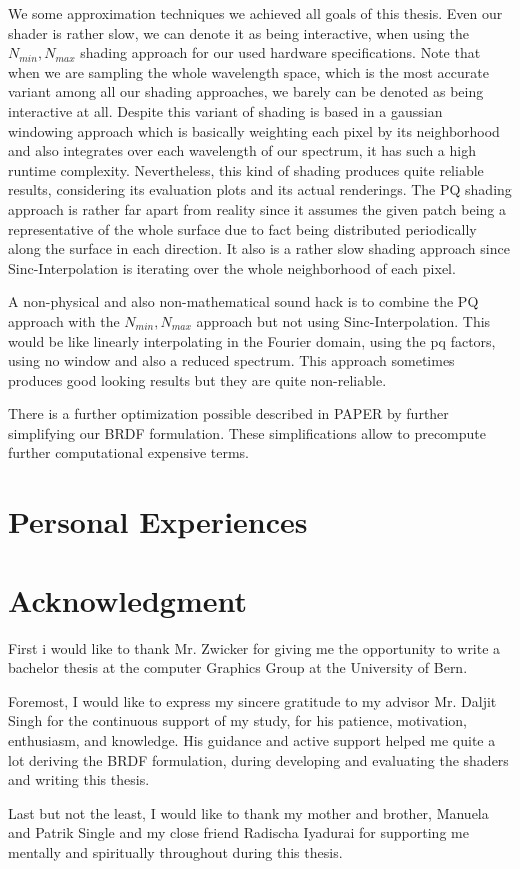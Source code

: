 We some approximation techniques we achieved all goals of this thesis. Even our shader is rather slow, we can denote it as being interactive, when using the $N_{min}, N_{max}$ shading approach for our used hardware specifications. Note that when we are sampling the whole wavelength space, which is the most accurate variant among all our shading approaches, we barely can be denoted as being interactive at all. Despite this variant of shading is based in a gaussian windowing approach which is basically weighting each pixel by its neighborhood and also integrates over each wavelength of our spectrum, it has such a high runtime complexity. Nevertheless, this kind of shading produces quite reliable results, considering its evaluation plots and its actual renderings. The PQ shading approach is rather far apart from reality since it assumes the given patch being a representative of the whole surface due to fact being distributed periodically along the surface in each direction. It also is a rather slow shading approach since Sinc-Interpolation is iterating over the whole neighborhood of each pixel. 

A non-physical and also non-mathematical sound hack is to combine the PQ approach with the $N_{min}, N_{max}$ approach but not using Sinc-Interpolation. This would be like linearly interpolating in the Fourier domain, using the pq factors, using no window and also a reduced spectrum. This approach sometimes produces good looking results but they are quite non-reliable. 

There is a further optimization possible described in PAPER by further simplifying our BRDF formulation. These simplifications allow to precompute further computational expensive terms.  

\section{Personal Experiences}


\section{Acknowledgment}
First i would like to thank Mr. Zwicker for giving me the opportunity to write a bachelor thesis at the computer Graphics Group at the University of Bern.

Foremost, I would like to express my sincere gratitude to my advisor Mr. Daljit Singh for the continuous support of my study, for his patience, motivation, enthusiasm, and knowledge. His guidance and active support helped me quite a lot deriving the BRDF formulation, during developing and evaluating the shaders and writing this thesis. 
  
Last but not the least, I would like to thank my mother and brother, Manuela and Patrik Single and my close friend Radischa Iyadurai for supporting me mentally and spiritually throughout during this thesis.
